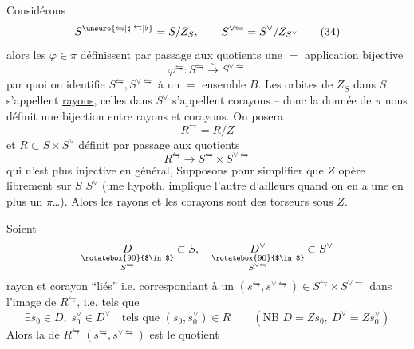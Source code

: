 Considérons
\[
 S^{\unsure{\leftrightharpoons|\natural|\leftrightarrows|\flat}}=S/Z_S,\qquad S^{\vee\leftrightharpoons}=S^\vee/Z_{S^\vee}
 \tag*{(34)}
\]
alors les $\varphi\in\pi$ définissent par passage aux quotients
une $=$ application bijective
\[
 \varphi^\leftrightharpoons:S^\leftrightharpoons\xrightarrow{\sim}S^{\vee\leftrightharpoons}
 \tag*{(35)}
\]
par quoi on identifie $S^\leftrightharpoons,S^{\vee\leftrightharpoons}$ à un $=$ ensemble $B$.
 Les orbites  de $Z_S$ dans $S$ s'appellent \uline{rayons}, 
celles dans $S^\vee$ s'appellent corayons -- donc la donnée
de $\pi$ nous définit une bijection entre  rayons et
 corayons. On posera
\[
 R^\leftrightharpoons=R/Z \tag*{(36)}
\]
et   $R\subset S\times S^\vee$ définit par passage
aux quotients
\[
 R^\leftrightharpoons\longrightarrow S^\leftrightharpoons\times S^{\vee\leftrightharpoons}\tag*{(37)}
\]
qui n'est plus injective en général,  
 Supposons pour simplifier que $Z$ opère librement
sur $S$  $S^\vee$ 
(une hypoth. implique l'autre d'ailleurs
quand on en a une en plus un $\pi$\ldots).
Alors les rayons et les corayons sont des torseurs sous $Z$.

Soient 
\[
 \underset{\substack{\rotatebox{90}{$\in$}\\S^\leftrightharpoons}}D\subset S,\quad
 \underset{\substack{\rotatebox{90}{$\in$}\\S^{\vee\leftrightharpoons}}}{D^\vee}\subset S^\vee
\]
 rayon et corayon ``liés'' i.e.  correspondant
à un $(s^\leftrightharpoons,s^{\vee\leftrightharpoons})\in S^\leftrightharpoons\times S^{\vee\leftrightharpoons}$ dans l'image de $R^\leftrightharpoons$,
i.e. tels que
\[
 \exists s_0\in D,\ s_0^\vee\in D^\vee\quad\text{tels que }(s_0,s_0^\vee)\in R
 \qquad(\text{NB }D=Zs_0,\ D^\vee=Zs_0^\vee) \tag*{(38)}
\]
Alors la   de $R^\leftrightharpoons$   $(s^{\leftrightharpoons},s^{\vee\leftrightharpoons})$ est le quotient

